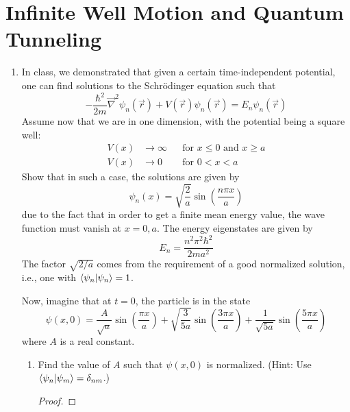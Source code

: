 \documentclass[../psets.tex]{subfiles}
\begin{document}
\section{Infinite Well Motion and Quantum Tunneling}
\begin{enumerate}
    \item {}In class, we demonstrated that given a certain time-independent potential, one can ﬁnd solutions to the Schr\"{o}dinger equation such that
    \begin{equation}
        -\frac{\hbar^2}{2m}\vec{\nabla}^2\psi_n(\vec{r})+V(\vec{r})\psi_n(\vec{r}) = E_n\psi_n(\vec{r})
    \end{equation}
    Assume now that we are in one dimension, with the potential being a square well:
    \begin{equation}
        \begin{aligned}
            V(x) &\to \infty && \text{for }x\leq 0\text{ and }x\geq a\\
            V(x) &\to 0      && \text{for }0<x<a
        \end{aligned}
    \end{equation}
    Show that in such a case, the solutions are given by
    \begin{equation}
        \psi_n(x) = \sqrt{\frac{2}{a}}\sin(\frac{n\pi x}{a})
    \end{equation}
    due to the fact that in order to get a finite mean energy value, the wave function must vanish at $x=0,a$. The energy eigenstates are given by
    \begin{equation}
        E_n = \frac{n^2\pi^2\hbar^2}{2ma^2}
    \end{equation}
    The factor $\sqrt{2/a}$ comes from the requirement of a good normalized solution, i.e., one with $\braket{\psi_n}=1$.\par
    Now, imagine that at $t=0$, the particle is in the state
    \begin{equation}\label{eqn:PS2E5}
        \psi(x,0) = \frac{A}{\sqrt{a}}\sin(\frac{\pi x}{a})+\sqrt{\frac{3}{5a}}\sin(\frac{3\pi x}{a})+\frac{1}{\sqrt{5a}}\sin(\frac{5\pi x}{a})
    \end{equation}
    where $A$ is a real constant.
    \begin{enumerate}
        \item Find the value of $A$ such that $\psi(x,0)$ is normalized. (Hint: Use $\braket{\psi_n}{\psi_m}=\delta_{nm}$.)
        \begin{proof}

\end{proof}
\end{enumerate}
\end{enumerate}
\end{document}
